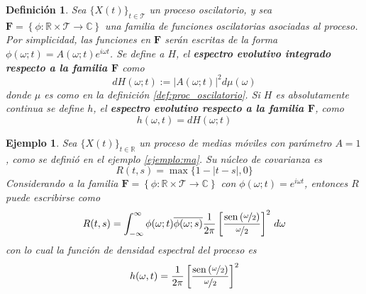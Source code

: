 \documentclass[12pt,letterpaper]{book}
\newtheorem{definicion}{Definición}[chapter]
\newtheorem{ejemplo}{Ejemplo}[chapter]
\newcommand{\R}{\mathbb{R}}
\newcommand{\C}{\mathbb{C}}
\newcommand{\intR}{\int_{-\infty}^{\infty}}
\newcommand{\ef}{\mathbf{F}}
\newcommand{\SEN}[1]{\mathrm{sen}\left( #1 \right)}
\newcommand{\abso}[1]{\left| #1 \right|}
\newcommand{\xt}{$\{X(t)\}_{t\in \mathcal{T}}$ }
\newcommand{\xtin}[1]{$\{X(t)\}_{t\in \mathcal{ #1 }}$ }
\begin{document}
\begin{definicion}
\label{def:espectro}
Sea \xt un proceso oscilatorio, y sea $\ef = \left\{ \phi: \R \times \mathcal{T} \rightarrow \C \right\}$ una familia de funciones oscilatorias asociadas al proceso.
%
Por simplicidad, las funciones en $\ef$ serán escritas de la forma $\phi(\omega;t) = A(\omega;t) e^{i \omega t}$.
% 
Se define a $H$, el \textbf{espectro evolutivo integrado respecto a la familia $\ef$} como
\begin{equation}
dH(\omega; t) := \abso{A(\omega;t)}^{2} d\mu(\omega)
\end{equation}
donde $\mu$ es como en la definición \ref{def:proc_oscilatorio}.
%
Si $H$ es absolutamente continua se define $h$, el \textbf{espectro evolutivo respecto a la familia $\ef$}, como
\begin{equation}
h(\omega, t) = dH(\omega; t)
\end{equation}
\end{definicion}

\begin{ejemplo}
Sea \xtin{\R} un proceso de medias móviles con parámetro $A=1$, como se definió en el ejemplo \ref{ejemplo:ma}. Su núcleo de covarianza es
\begin{equation}
R(t,s) = \max\{ 1 - \abso{t-s} , 0 \}
\end{equation}
Considerando a la familia $\ef = \left\{ \phi: \R \times \mathcal{T} \rightarrow \C \right\}$ con $\phi(\omega; t) = e^{i \omega t}$, entonces $R$ puede escribirse como
\begin{equation}
R(t,s) = \intR \phi(\omega;t) \overline{\phi(\omega;s)} \frac{1}{2 \pi} \left[ \frac{\SEN{\nicefrac{\omega}{2}}}{\nicefrac{\omega}{2}} \right]^2 \, d\omega
\end{equation}
con lo cual la función de densidad espectral del proceso es 
\begin{equation}
h(\omega, t) = \frac{1}{2 \pi} \left[ \frac{\SEN{\nicefrac{\omega}{2}}}{\nicefrac{\omega}{2}} \right]^2
\end{equation}
\end{ejemplo}
\end{document}
